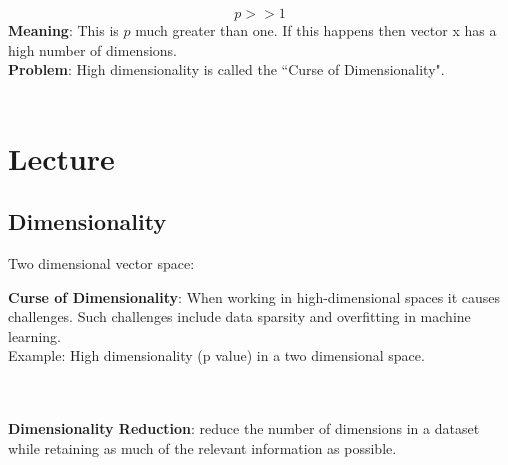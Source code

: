 \[
    p>>1
\]
\textbf{Meaning}: This is $p$ much greater than one. If this happens then vector x has a high number of dimensions. \\
\textbf{Problem}: High dimensionality is called the ``Curse of Dimensionality". \\\\

\section{Lecture}
\subsection{Dimensionality}

Two dimensional vector space:




\textbf{Curse of Dimensionality}: When working in high-dimensional spaces it causes challenges. Such challenges include data sparsity and overfitting in machine learning. \\

Example:  High dimensionality (p value) in a two dimensional space.\\

\\\\
\textbf{Dimensionality Reduction}: reduce the number of dimensions in a dataset while retaining as much of the relevant information as possible. \\

